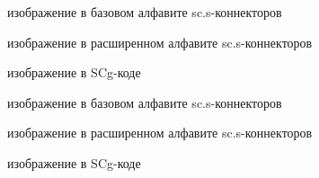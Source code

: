 \begin{scnstruct}
    \begin{scnrelfromlist}{изображение в базовом алфавите sc.s-коннекторов}
        \scnitem{\scnfileclass{\textunderscore\textunderscore->}}
        \scnitem{\scnfileclass{<-\textunderscore\textunderscore}}
    \end{scnrelfromlist}
    \begin{scnrelfromlist}{изображение в расширенном алфавите sc.s-коннекторов}
        \scnitem{\scnfileclass{\textunderscore\textunderscore$\ni$}}
        \scnitem{\scnfileclass{$\in$\textunderscore\textunderscore}}
    \end{scnrelfromlist}
    \begin{scnrelfromlist}{изображение в SCg-коде}
    \end{scnrelfromlist}

    \begin{scnrelfromlist}{изображение в базовом алфавите sc.s-коннекторов}
        \scnitem{\scnfileclass{\textunderscore\textunderscore-|>}}
        \scnitem{\scnfileclass{<|-\textunderscore\textunderscore}}
    \end{scnrelfromlist}
    \begin{scnrelfromlist}{изображение в расширенном алфавите sc.s-коннекторов}
        \scnitem{\scnfileclass{\textunderscore\textunderscore$\not\ni$}}
        \scnitem{\scnfileclass{$\notin$\textunderscore\textunderscore}}
    \end{scnrelfromlist}
    \begin{scnrelfromlist}{изображение в SCg-коде}
    \end{scnrelfromlist}


\end{scnstruct}
